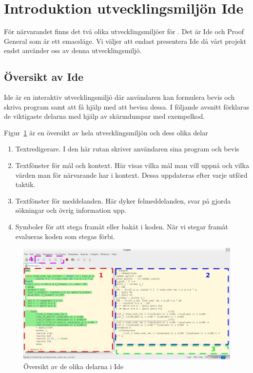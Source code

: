\section{Introduktion utvecklingsmiljön \coq  Ide}

För närvarandet finns det två olika utvecklingsmiljöer för \coq.
Det är \coq Ide och Proof General som är ett emacsläge. Vi väljer att endast
presentera \coq Ide då vårt projekt endst använder oss av denna utvecklingsmiljö.


\subsection{Översikt av \coq Ide}

\coq Ide är en interaktiv utvecklingsmiljö där användaren kan
formulera bevis och skriva program samt att få hjälp med att bevisa
dessa. I följande avsnitt förklaras de viktigaste delarna med
hjälp av skärmdumpar med exempelkod.


Figur~\ref{fig:oversikt} är en översikt av hela utvecklingsmiljön och dess olika delar
\begin{enumerate}
\item Textredigerare. I den här rutan skriver användaren sina program och bevis
\item Textfönster för mål och kontext. Här visas vilka mål man vill uppnå och
  vilka värden man för närvarande har i kontext. Dessa uppdateras efter varje
  utförd taktik.
\item Textfönster för meddelanden. Här dyker felmeddelanden, svar på
  gjorda sökningar och övrig information upp.
\item Symboler för att stega framåt eller bakåt i koden. När vi stegar framåt
  evalueras koden som stegas förbi.
\end{enumerate}

\filbreak

\begin{figure}[H]
  \centering
  \includegraphics[width=\textwidth]{images/Overview}
  \caption[Översikt av \coq Ide]
   {Översikt av de olika delarna i \coq{} Ide}
  \label{fig:oversikt}
\end{figure}


